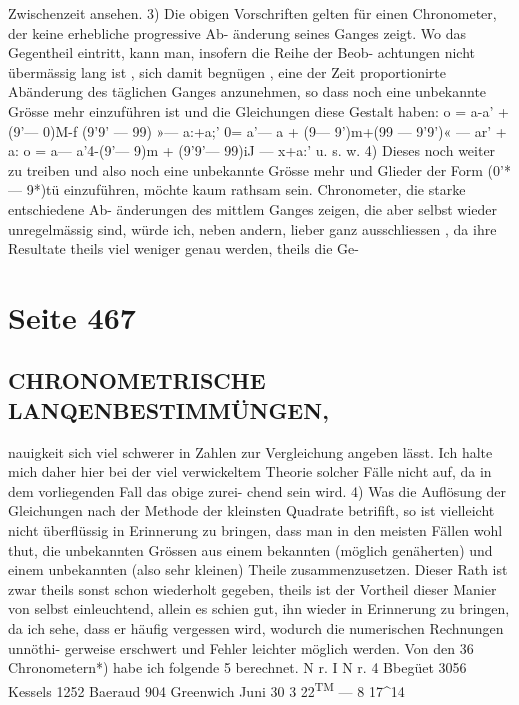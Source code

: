 \documentclass[10pt,a4paper]{article}
\begin{document}
Zwischenzeit  ansehen.
3)  Die  obigen  Vorschriften  gelten  für  einen  Chronometer,  der  keine  erhebliche  progressive  Ab-
änderung seines  Ganges  zeigt.  Wo  das  Gegentheil  eintritt,  kann  man,  insofern  die  Reihe  der  Beob-
achtungen nicht  übermässig  lang  ist ,  sich  damit  begnügen ,  eine  der  Zeit  proportionirte  Abänderung
des  täglichen  Ganges  anzunehmen,  so  dass  noch  eine  unbekannte  Grösse  mehr  einzuführen  ist  und  die
Gleichungen  diese  Gestalt  haben:
o  =  a-a'  +(9'--- 0)M-f  (9'9'  ---  99)  »---  a:+a;'
0=  a'--- a\glqq{}  +  (9\glqq{}--- 9')m+(9\glqq{}9\glqq{}  --- 9'9')«  --- ar'  +  a:\glqq{}
o  =  a\glqq{}--- a\glqq{}'4-(9\glqq{}'--- 9\glqq{})m  +  (9\glqq{}'9\glqq{}'--- 9\glqq{}9\glqq{})iJ  --- x\glqq{}+a:\glqq{}'
u.  s.  w.
4)  Dieses  noch  weiter  zu  treiben  und  also  noch  eine  unbekannte  Grösse  mehr  und  Glieder  der
Form  (0'*  ---  9*)tü  einzuführen,  möchte  kaum  rathsam  sein.  Chronometer,  die  starke  entschiedene  Ab-
änderungen des  mittlem  Ganges  zeigen,  die  aber  selbst  wieder  unregelmässig  sind,  würde  ich,  neben
andern,  lieber  ganz  ausschliessen ,   da  ihre  Resultate  theils  viel  weniger  genau  werden,  theils  die  Ge-

\newpage
\section*{Seite 467}

\subsection*{CHRONOMETRISCHE  LANQENBESTIMMÜNGEN,}

nauigkeit  sich  viel  schwerer  in  Zahlen  zur  Vergleichung  angeben  lässt.  Ich  halte  mich  daher  hier  bei
der  viel  verwickeltem  Theorie  solcher  Fälle  nicht  auf,  da  in  dem  vorliegenden  Fall  das  obige  zurei-
chend sein  wird.
4)  Was  die  Auflösung  der  Gleichungen  nach  der  Methode  der  kleinsten  Quadrate  betrifift,  so  ist
vielleicht  nicht  überflüssig  in  Erinnerung  zu  bringen,  dass  man  in  den  meisten  Fällen  wohl  thut,  die
unbekannten  Grössen  aus  einem  bekannten  (möglich  genäherten)  und  einem  unbekannten  (also  sehr
kleinen)  Theile  zusammenzusetzen.  Dieser  Rath  ist  zwar  theils  sonst  schon  wiederholt  gegeben,  theils
ist  der  Vortheil  dieser  Manier  von  selbst  einleuchtend,  allein  es  schien  gut,  ihn  wieder  in  Erinnerung
zu  bringen,  da  ich  sehe,  dass  er  häufig  vergessen  wird,  wodurch  die  numerischen  Rechnungen  unnöthi-
gerweise  erschwert  und  Fehler  leichter  möglich  werden.
Von  den  36  Chronometern*)  habe  ich  folgende  5  berechnet.
N r.  I
N
r.  4
Bbegüet  3056
Kessels  1252
Baeraud  904
Greenwich
Juni  30
3\glqq{}
22\textsuperscript{TM}
---    8\glqq{}
17\textasciicircum{}14
\end{document}
